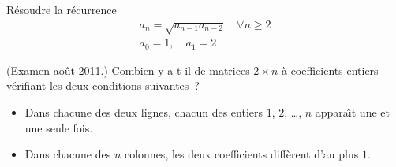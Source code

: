 
\begin{exo}
R\'esoudre la r\'ecurrence
\[
\begin{array}{l}
a_n = \sqrt{a_{n-1} a_{n-2}} \quad \forall n \geqslant 2\\
a_0 = 1, \quad a_1 = 2
\end{array}
\]
\end{exo}


\begin{exo} (Examen ao\^ut 2011.)
Combien y a-t-il de matrices $2 \times n$ \`a coefficients entiers v\'erifiant les deux conditions suivantes~?
%
\begin{itemize}
\item Dans chacune des deux lignes, chacun des entiers $1$, $2$, \ldots, $n$ appara\^\i{}t une et une seule fois.
\item Dans chacune des $n$ colonnes, les deux coefficients diff\`erent d'au plus $1$.
\end{itemize}
\end{exo}